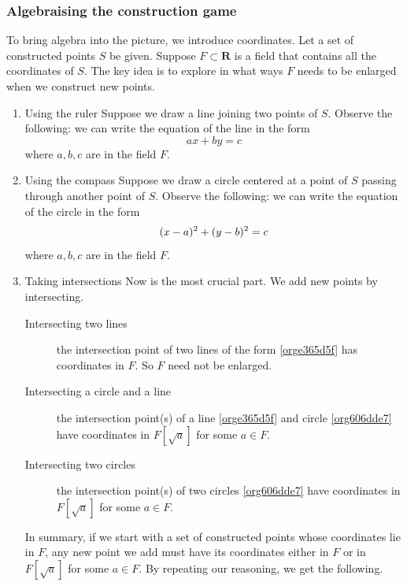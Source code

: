 \documentclass[11pt]{article}
\begin{document}
\subsubsection{Algebraising the construction game}
\label{sec:org540a679}
To bring algebra into the picture, we introduce coordinates.
Let a set of constructed points \(S\) be given.
Suppose \(F \subset \mathbf{R}\) is a field that contains all the coordinates of \(S\).
The key idea is to explore in what ways \(F\) needs to be enlarged when we construct new points.
\begin{enumerate}
\item Using the ruler
\label{sec:org6989975}
Suppose we draw a line joining two points of \(S\).
Observe the following: we can write the equation of the line in the form
\begin{equation}
ax + by = c
\label{orge365d5f}
\end{equation}
where \(a,b,c\) are in the field \(F\).
\item Using the compass
\label{sec:org803484c}
Suppose we draw a circle centered at a point of \(S\) passing through another point of \(S\).
Observe the following: we can write the equation of the circle in the form
\begin{equation}
(x-a)\textsuperscript{2} + (y-b)\textsuperscript{2} = c
\label{org606dde7}
\end{equation}
where \(a,b,c\) are in the field \(F\).
\item Taking intersections
\label{sec:org94e48d8}
Now is the most crucial part.  We add new points by intersecting.
\begin{description}
\item[{Intersecting two lines}] the intersection point of two lines of the form \ref{orge365d5f} has coordinates in \(F\).  So \(F\) need not be enlarged.
\item[{Intersecting a circle and a line}] the intersection point(s) of a line \ref{orge365d5f} and circle \ref{org606dde7} have coordinates in \(F[\sqrt a]\) for some \(a \in F\).
\item[{Intersecting two circles}] the intersection point(s) of two circles \ref{org606dde7} have coordinates in \(F[\sqrt a]\) for some \(a \in F\).
\end{description}

In summary, if we start with a set of constructed points whose coordinates lie in \(F\), any new point we add must have its coordinates either in \(F\) or in \(F[\sqrt a]\) for some \(a \in F\).  By repeating our reasoning, we get the following.
\end{enumerate}
\end{document}
